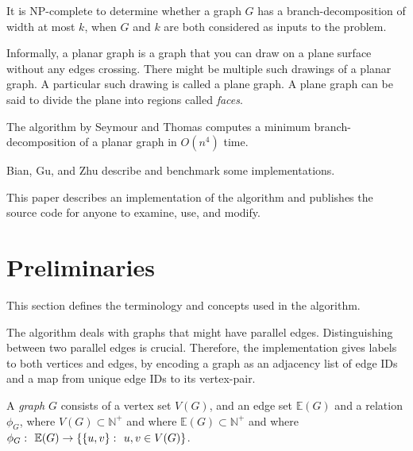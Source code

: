 \documentclass{article}
\begin{document}
	It is NP-complete to determine whether a graph $G$ has a branch-decomposition of width at most $k$, when $G$ and $k$ are both considered as inputs to the problem.\cite{ST93}

	Informally, a planar graph is a graph that you can draw on a plane surface without any edges crossing. There might be multiple such drawings of a planar graph. A particular such drawing is called a plane graph. A plane graph can be said to divide the plane into regions called \textit{faces}.

	The algorithm by Seymour and Thomas\cite{ST93} computes a minimum branch-decomposition of a planar graph in $O(n^4)$ time.
	
	Bian, Gu, and Zhu\cite{BGZ15} describe and benchmark some implementations.

	This paper describes an implementation of the algorithm and publishes the source code for anyone to examine, use, and modify.





\section{Preliminaries}

	This section defines the terminology and concepts used in the algorithm.

	The algorithm deals with graphs that might have parallel edges. Distinguishing between two parallel edges is crucial. Therefore, the implementation gives labels to both vertices and edges, by encoding a graph as an adjacency list of edge IDs and a map from unique edge IDs to its vertex-pair.

	A \textit{graph} $G$ consists of a vertex set $V(G)$, and an edge set $\mathbb{E}(G)$ and a relation $\phi_G$, where $V(G) \subset \mathbb{N}^+$ and where $\mathbb{E}(G) \subset \mathbb{N}^+$ and where $\phi_G \,\colon\  \mathbb{E}(G) \to \{\{u,v\} \,\colon\  u,v \in V(G)\}$.
\end{document}
